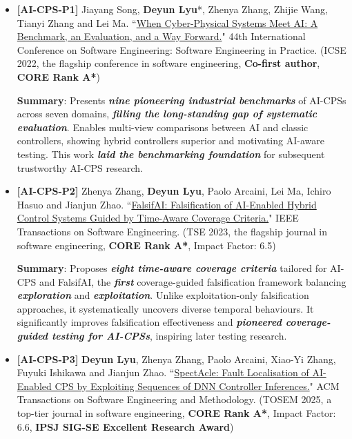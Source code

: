 \documentclass[11pt,a4paper]{article}
\newcommand{\highlight}[1]{\textcolor{burgundy}{\textbf{#1}}}
\newcommand{\strongit}[1]{\textbf{\textit{#1}}}
\begin{document}
\begin{itemize}[leftmargin=*]
    \item \textbf{[AI-CPS-P1]} Jiayang Song, \textbf{Deyun Lyu}*, Zhenya Zhang, Zhijie Wang, Tianyi Zhang and Lei Ma. ``\href{https://dl.acm.org/doi/10.1145/3510457.3513049}{When Cyber-Physical Systems Meet AI: A Benchmark, an Evaluation, and a Way Forward.}" 44th International Conference on Software Engineering: Software Engineering in Practice. (ICSE 2022, the flagship conference in software engineering, \highlight{Co-first author}, \highlight{CORE Rank A*})
    
    \textbf{Summary}: Presents \strongit{nine pioneering industrial benchmarks} of AI-CPSs across seven domains, \strongit{filling the long-standing gap of systematic evaluation}. Enables multi-view comparisons between AI and classic controllers, showing hybrid controllers superior and motivating AI-aware testing. This work \strongit{laid the benchmarking foundation} for subsequent trustworthy AI-CPS research.
    \item \textbf{[AI-CPS-P2]} Zhenya Zhang, \textbf{Deyun Lyu}, Paolo Arcaini, Lei Ma, Ichiro Hasuo and Jianjun Zhao. ``\href{https://ieeexplore.ieee.org/document/9844247}{FalsifAI: Falsification of AI-Enabled Hybrid Control Systems Guided by Time-Aware Coverage Criteria.}" IEEE Transactions on Software Engineering. (TSE 2023, the flagship journal in software engineering, \highlight{CORE Rank A*}, Impact Factor: 6.5)

    \textbf{Summary}: Proposes \strongit{eight time-aware coverage criteria} tailored for AI-CPS and FalsifAI, the \strongit{first} coverage-guided falsification framework balancing \strongit{exploration} and \strongit{exploitation}. Unlike exploitation-only falsification approaches, it systematically uncovers diverse temporal behaviours. It significantly improves falsification effectiveness and \strongit{pioneered coverage-guided testing for AI-CPSs}, inspiring later testing research.
    \item \textbf{[AI-CPS-P3]} \textbf{Deyun Lyu}, Zhenya Zhang, Paolo Arcaini, Xiao-Yi Zhang, Fuyuki Ishikawa and Jianjun Zhao. ``\href{https://dl.acm.org/doi/10.1145/3705307}{SpectAcle: Fault Localisation of AI-Enabled CPS by Exploiting Sequences of DNN Controller Inferences.}" ACM Transactions on Software Engineering and Methodology. (TOSEM 2025, a top-tier journal in software engineering, \highlight{CORE Rank A*}, Impact Factor: 6.6, \highlight{IPSJ SIG-SE Excellent Research Award})
    

\end{itemize}
\end{document}
